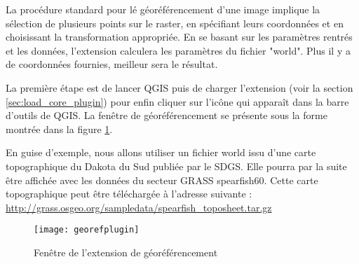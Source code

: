 La procédure standard pour lé géoréférencement d'une image implique la sélection de plusieurs points sur le raster, en spécifiant leurs coordonnées et en choisissant la transformation appropriée. En se basant sur les paramètres rentrés et les données, l'extension calculera les paramètres du fichier "world". Plus il y a de coordonnées fournies, meilleur sera le résultat.


La première étape est de lancer QGIS puis de charger l'extension (voir la section \ref{sec:load_core_plugin}) pour enfin cliquer sur l'icône  qui apparaît dans la barre d'outils de QGIS. La fenêtre de géoréférencement se présente sous la forme montrée dans la figure \ref{fig:georefplugin}.
 

En guise d'exemple, nous allons utiliser un fichier world issu d'une carte topographique du Dakota du Sud publiée par le SDGS.
Elle pourra par la suite être affichée avec les données du secteur GRASS spearfish60. Cette carte topographique peut être téléchargée à l'adresse suivante : \url{http://grass.osgeo.org/sampledata/spearfish\_toposheet.tar.gz}


\begin{figure}[ht]
\begin{center}
\caption{Fenêtre de l'extension de géoréférencement \nixcaption}\label{fig:georefplugin}\smallskip
  \texttt{[image: georefplugin]}
\end{center}
\end{figure}

